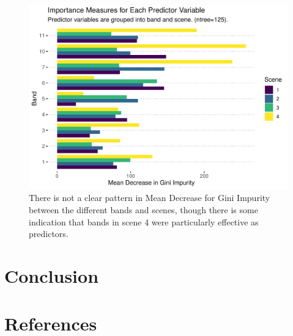 \documentclass[
]{article}
\begin{document}
\begin{figure}
\centering
\includegraphics{../results/plots/importance_barplot_ntree125.pdf}
\caption{There is not a clear pattern in Mean Decrease for Gini Impurity
between the different bands and scenes, though there is some indication
that bands in scene 4 were particularly effective as predictors.}
\end{figure}

\hypertarget{conclusion}{%
\section{Conclusion}\label{conclusion}}

\newpage

\hypertarget{references}{%
\section{References}\label{references}}
\end{document}
